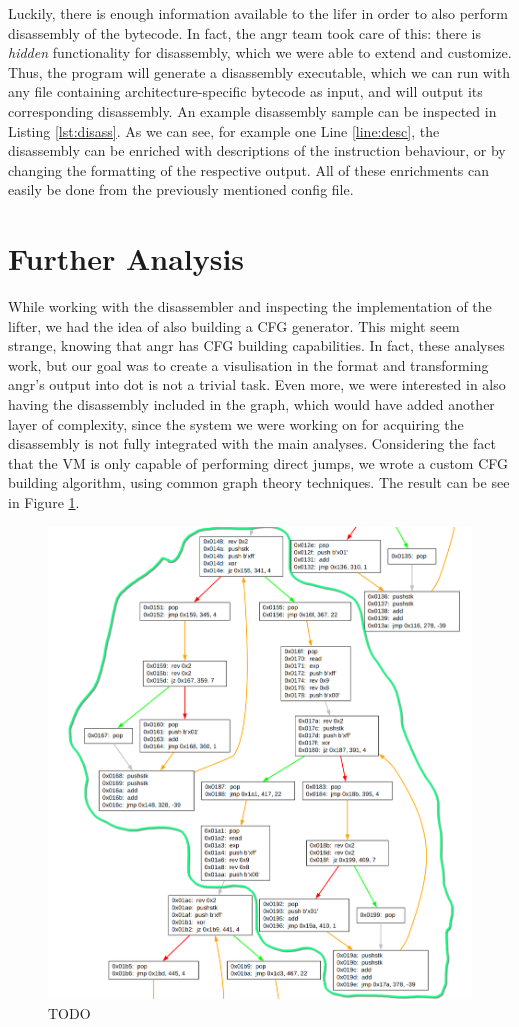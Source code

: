 Luckily, there is enough information available to the lifer in order to also perform disassembly of the bytecode. In fact, the angr team took care of this: there is \emph{hidden} functionality for disassembly, which we were able to extend and customize. Thus, the  program will generate a disassembly executable, which we can run with any file containing architecture-specific bytecode as input, and will output its corresponding disassembly. An example disassembly sample can be inspected in Listing \ref{lst:disass}. As we can see, for example one Line \ref{line:desc}, the disassembly can be enriched with descriptions of the instruction behaviour, or by changing the formatting of the respective output. All of these enrichments can easily be done from the previously mentioned  config file.

\section{Further Analysis}

While working with the disassembler and inspecting the implementation of the  lifter, we had the idea of also building a \gls{CFG} generator. This might seem strange, knowing that angr has \gls{CFG} building capabilities. In fact, these analyses work, but our goal was to create a visulisation in the  format and transforming angr's output into dot is not a trivial task. Even more, we were interested in also having the disassembly included in the graph, which would have added another layer of complexity, since the system we were working on for acquiring the disassembly is not fully integrated with the main analyses. Considering the fact that the  \gls{VM} is only capable of performing direct jumps, we wrote a custom \gls{CFG} building algorithm, using common graph theory techniques. The result can be see in Figure \ref{fig:cfg_bytecode}.

\begin{figure}[h]
    \centering
    \includegraphics[width=.8\textwidth]{./images/cfg}
    \caption{TODO}
    \label{fig:cfg_bytecode}
\end{figure}


